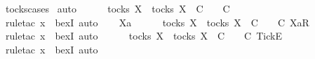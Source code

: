 \ tocks{\isachardot}cases\isanewline
{}\isamarkupfalse%
\ auto\isanewline
\ \ \isamarkupfalse%
\ {\isachardoublequoteopen}{\isacharbrackleft}{\isacharbrackright}\ {\isasymin}\ tocks\ X\ {\isasymLongrightarrow}\ {\isasymexists}{\isasymrho}{\isacharprime}{\isasymin}tocks\ X{\isachardot}\ {\isasymrho}{\isacharprime}\ {\isasymsubseteq}\isactrlsub C\ {\isacharbrackleft}{\isacharbrackright}\ {\isasymand}\ {\isasymrho}{\isacharprime}\ {\isasymle}\isactrlsub C\ {\isacharbrackleft}{\isacharbrackright}{\isachardoublequoteclose}\isanewline
\ \ \ \ \isamarkupfalse%
\ {\isacharparenleft}rule{\isacharunderscore}tac\ x{\isacharequal}{\isachardoublequoteopen}{\isacharbrackleft}{\isacharbrackright}{\isachardoublequoteclose}\ \ bexI{\isacharcomma}\ auto{\isacharparenright}\isanewline
{}\isamarkupfalse%
\isanewline
\ \ \isamarkupfalse%
\ Xa\isanewline
\ \ \isamarkupfalse%
\ {\isachardoublequoteopen}{\isacharbrackleft}{\isacharbrackright}\ {\isasymin}\ tocks\ X\ {\isasymLongrightarrow}\ {\isasymexists}{\isasymrho}{\isacharprime}{\isasymin}tocks\ X{\isachardot}\ {\isasymrho}{\isacharprime}\ {\isasymsubseteq}\isactrlsub C\ {\isacharbrackleft}{\isacharbrackright}\ {\isasymand}\ {\isasymrho}{\isacharprime}\ {\isasymle}\isactrlsub C\ {\isacharbrackleft}{\isacharbrackleft}Xa{\isacharbrackright}\isactrlsub R{\isacharbrackright}{\isachardoublequoteclose}\isanewline
\ \ \ \ \isamarkupfalse%
\ {\isacharparenleft}rule{\isacharunderscore}tac\ x{\isacharequal}{\isachardoublequoteopen}{\isacharbrackleft}{\isacharbrackright}{\isachardoublequoteclose}\ \ bexI{\isacharcomma}\ auto{\isacharparenright}\isanewline
{}\isamarkupfalse%
\isanewline
\ \ \isamarkupfalse%
\ {\isachardoublequoteopen}{\isacharbrackleft}{\isacharbrackright}\ {\isasymin}\ tocks\ X\ {\isasymLongrightarrow}\ {\isasymexists}{\isasymrho}{\isacharprime}{\isasymin}tocks\ X{\isachardot}\ {\isasymrho}{\isacharprime}\ {\isasymsubseteq}\isactrlsub C\ {\isacharbrackleft}{\isacharbrackright}\ {\isasymand}\ {\isasymrho}{\isacharprime}\ {\isasymle}\isactrlsub C\ {\isacharbrackleft}{\isacharbrackleft}Tick{\isacharbrackright}\isactrlsub E{\isacharbrackright}{\isachardoublequoteclose}\isanewline
\ \ \ \ \isamarkupfalse%
\ {\isacharparenleft}rule{\isacharunderscore}tac\ x{\isacharequal}{\isachardoublequoteopen}{\isacharbrackleft}{\isacharbrackright}{\isachardoublequoteclose}\ \ bexI{\isacharcomma}\ auto{\isacharparenright}\isanewline
{}\isamarkupfalse%

